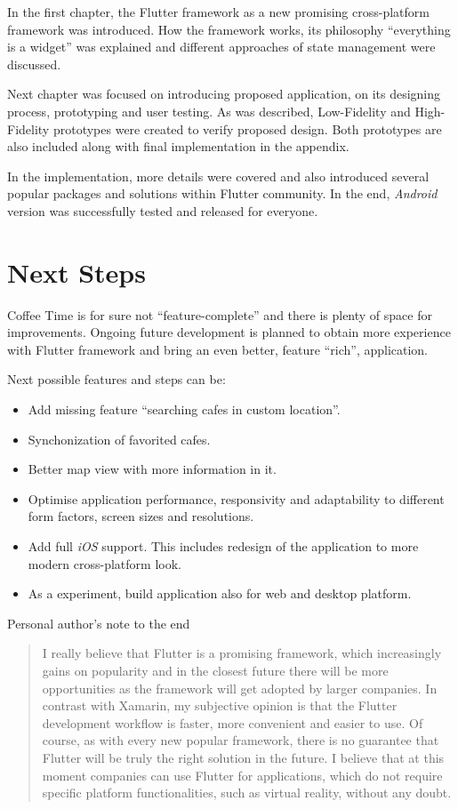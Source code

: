 \begin{conclusion}
In the first chapter, the Flutter framework as a new promising cross-platform framework was introduced. How the framework works, its philosophy ``everything is a widget'' was explained and different approaches of state management were discussed. 

Next chapter was focused on introducing proposed application, on its designing process, prototyping and user testing. As was described, Low-Fidelity and High-Fidelity prototypes were created to verify proposed design. Both prototypes are also included along with final implementation in the appendix. 

In the implementation, more details were covered and also introduced several popular packages and solutions within Flutter community. In the end, \textit{Android} version was successfully tested and released for everyone. 

\section{Next Steps}
Coffee Time is for sure not ``feature-complete'' and there is plenty of space for improvements. Ongoing future development is planned to obtain more experience with Flutter framework and bring an even better, feature ``rich'', application. 

Next possible features and steps can be:

\begin{itemize}
    \item Add missing feature ``searching cafes in custom location''.
    \item Synchonization of favorited cafes.
    \item Better map view with more information in it.
    \item Optimise application performance, responsivity and adaptability to different form factors, screen sizes and resolutions.
    \item Add full \textit{iOS} support. This includes redesign of the application to more modern cross-platform look. 
    \item As a experiment, build application also for web and desktop platform.
\end{itemize}

Personal author's note to the end

\begin{quote}
I really believe that Flutter is a promising framework, which increasingly gains on popularity and in the closest future there will be more opportunities as the framework will get adopted by larger companies. In contrast with Xamarin, my subjective opinion is that the Flutter development workflow is faster, more convenient and easier to use. Of course, as with every new popular framework, there is no guarantee that Flutter will be truly the right solution in the future. I believe that at this moment companies can use Flutter for applications, which do not require specific platform functionalities, such as virtual reality, without any doubt.
\end{quote}
\end{conclusion}